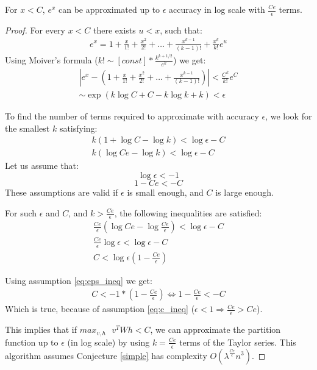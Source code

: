 \begin{lemma}
	For $x < C$, $e^x$ can be approximated up to $\epsilon$ accuracy in log scale with $\frac{Ce}{\epsilon}$ terms. 
\end{lemma}
\begin{proof}

For every $x < C$ there exists $u < x$, such that:  
\begin{align*}
	e^x = 1 + \frac{x}{1!} + \frac{x^2}{2!} + \dots + \frac{x^{k - 1}}{(k - 1)!} + \frac{x^k}{k!}e^u
\end{align*}
Using Moiver's formula ($k! \sim [const] * \frac{k^{k + 1/2}}{e^k}$) we get:
\begin{align*}
	|e^x - (1 + \frac{x}{1!} + \frac{x^2}{2!} + \dots + \frac{x^{k - 1}}{(k - 1)!}) | < \frac{C^k}{k!}e^C \\
	\sim \exp(k\log{C} + C - k\log{k} + k) < \epsilon
\end{align*}

To find the number of terms required to approximate with accuracy $\epsilon$, we look for 
the smallest $k$ satisfying: 
\begin{align*}
	k (1 + \log{C} - \log{k}) < \log{\epsilon} - C\\ 
	k (\log{Ce} - \log{k}) < \log{\epsilon} - C
\end{align*}
Let us assume that:
\begin{equation}
\label{eq:eps_ineq}
\log{\epsilon} < -1
\end{equation}
\begin{equation}
\label{eq:c_ineq}
1 - Ce < -C
\end{equation}
These assumptions are valid if $\epsilon$ is small enough, and $C$ is large enough.

For such $\epsilon$ and $C$, and $k > \frac{Ce}{\epsilon}$, the
following inequalities are satisfied:
\begin{align*}
	\frac{Ce}{\epsilon} (\log{Ce} - \log{\frac{Ce}{\epsilon}}) < \log{\epsilon} - C \\
	\frac{Ce}{\epsilon} \log{\epsilon} < \log{\epsilon} - C\\
	C < \log{\epsilon}(1 - \frac{Ce}{\epsilon})
\end{align*}

Using assumption \ref{eq:eps_ineq} we get:
\begin{align*}
  C < -1 * (1 - \frac{Ce}{\epsilon}) \Leftrightarrow 1 - \frac{Ce}{\epsilon} < -C
\end{align*}
Which is true, because of assumption \ref{eq:c_ineq} ($\epsilon < 1 \Rightarrow \frac{Ce}{\epsilon} > Ce$).

This implies that if $max_{v,h}\text{ } v^TWh < C$, we can
approximate the partition function up to $\epsilon$ (in log scale)
by using $k = \frac{Ce}{\epsilon}$ terms of the Taylor series. 
This algorithm assumes Conjecture \ref{simple} has complexity $O(\lambda^{\frac{Ce}{\epsilon}}n^3)$.

\vspace{-5mm}
\end{proof}
\vspace{-5mm}


